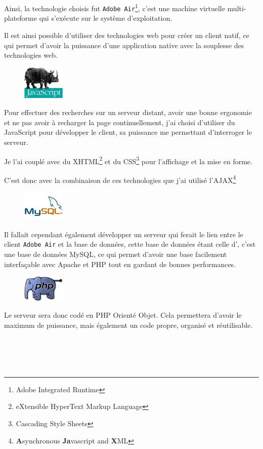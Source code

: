          Ainsi, la technologie choisis fut \texttt{Adobe Air}\footnote{Adobe Integrated Runtime}, c'est une machine virtuelle multi-plateforme qui s'exécute sur le système d'exploitation.

        Il est ainsi possible d'utiliser des technologies web pour créer un client natif, ce qui permet d'avoir la puissance d'une application native avec la souplesse des technologies web.
        \newpage
       \begin{figure}
            \includegraphics[width=2.0cm]{images/2-activite/javascript.jpg}
        \end{figure}
        Pour effectuer des recherches sur un serveur distant, avoir une bonne ergonomie et ne pas avoir à recharger la page continuellement, j'ai choisi d'utiliser du JavaScript pour développer le client,
        sa puissance me permettant d'interroger le serveur.

        Je l'ai couplé avec du XHTML\footnote{eXtensible HyperText Markup Language} et du CSS\footnote{Cascading Style Sheets} pour l'affichage et la mise en forme.

        C'est donc avec la combinaison de ces technologies que j'ai utilisé l'AJAX\footnote{\textbf{A}synchronous \textbf{Ja}vascript and \textbf{X}ML}\\

     \begin{figure}
           \includegraphics[width=2cm]{images/2-activite/mysql.jpg}
     \end{figure}
        Il fallait cependant également développer un serveur qui ferait le lien entre le client \texttt{Adobe Air} et la base de données, cette base de données étant celle d'\adt{}, c'est une base de données MySQL, ce qui permet d'avoir une base facilement interfaçable avec Apache et PHP tout en gardant de bonnes performances.\\

     \begin{figure}\vspace{-5px}
           \includegraphics[width=2cm]{images/2-activite/php.png}
      \end{figure}
        Le serveur sera donc codé en PHP Orienté Objet. Cela permettera d'avoir le maximum de puissance, mais également un code propre, organisé et réutilisable. \\~\\~\\~\\~~

